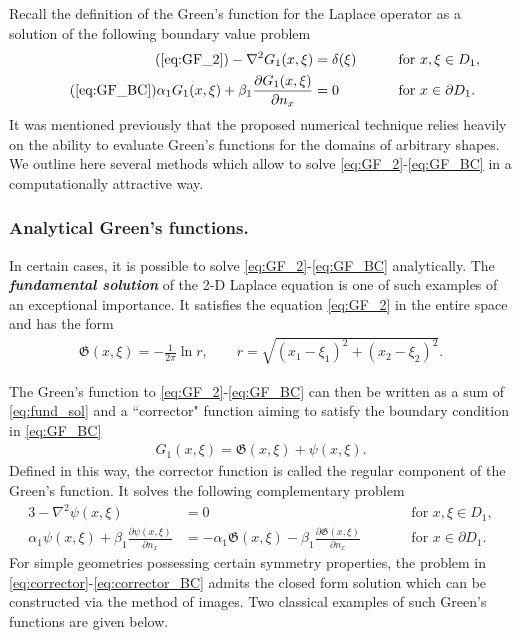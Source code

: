 Recall the definition of the Green's function for the Laplace operator as a solution of the following boundary value problem
\begin{alignat*}{3}
    \tag{\ref{eq:GF_2}}
	-\nabla^2 G_1(x,\xi)                                                     & = \delta(\xi)  &\qquad &\text{for } x, \xi \in D_1,
	\\\tag{\ref{eq:GF_BC}}
	\alpha_1 G_1(x,\xi) + \beta_1 \frac{\partial G_1(x,\xi)}{\partial n_x}   & = 0  &\qquad &\text{for } x \in \partial D_1.
\end{alignat*}
It was mentioned previously that the proposed numerical technique relies heavily on the ability to evaluate Green's functions for the domains of arbitrary shapes.
We outline here several methods which allow to solve \eqref{eq:GF_2}-\eqref{eq:GF_BC} in a computationally attractive way.



\subsubsection{Analytical Green's functions.}

In certain cases, it is possible to solve \eqref{eq:GF_2}-\eqref{eq:GF_BC} analytically.
The \textbf{\textit{fundamental solution}} of the 2-D Laplace equation is one of such examples of an exceptional importance. 
It satisfies the equation \eqref{eq:GF_2} in the entire space and has the form
\begin{align} \label{eq:fund_sol}
	\mathfrak{G}(x,\xi) = -\frac{1}{2 \pi} \ln r,
	\qquad
	r = \sqrt{ (x_1-\xi_1)^2 + (x_2-\xi_2)^2 }.
\end{align}

The Green's function to \eqref{eq:GF_2}-\eqref{eq:GF_BC} can then be written as a sum of \eqref{eq:fund_sol} and a ``corrector" function aiming to satisfy the boundary condition in \eqref{eq:GF_BC}
\begin{align} \label{eq:GF_general}
	G_1(x,\xi) = \mathfrak{G}(x,\xi) + \psi(x, \xi).
\end{align}
Defined in this way, the corrector function is called the regular component of the Green's function.
It solves the following complementary problem
\begin{alignat}{3} \label{eq:corrector}
	-\nabla^2 \psi(x,\xi)                                                   & = 0  &\qquad &\text{for } x, \xi \in D_1,
	\\ \label{eq:corrector_BC}
	\alpha_1 \psi(x,\xi) + \beta_1 \frac{\partial \psi(x,\xi)}{\partial n_x}   & = -\alpha_1 \mathfrak{G}(x,\xi) - \beta_1 \frac{\partial \mathfrak{G}(x,\xi)}{\partial n_x}  &\qquad &\text{for } x \in \partial D_1.
\end{alignat}
For simple geometries possessing certain symmetry properties, the problem in \eqref{eq:corrector}-\eqref{eq:corrector_BC} admits the closed form solution which can be constructed via the method of images.
Two classical examples of such Green's functions are given below.


